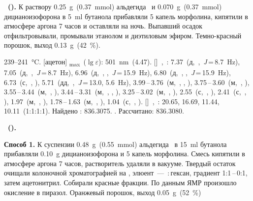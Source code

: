 \textbf{~().} К раствору \SI{0.25}{\gram}~(\SI{0.37}{\mmol}) альдегида~\textbf{} и \SI{0.070}{\gram}~(\SI{0.37}{\mmol}) дицианоизофорона в \SI{5}{\milli\litre} бутанола прибавляли 5 капель морфолина, кипятили в атмосфере аргона 7 часов и оставляли на ночь. Выпавший осадок отфильтровывали, промывали этанолом и диэтиловым эфиром. Темно-красный порошок, выход \SI{0.13}{\gram}~(\SI{42}{\percent}).
\begin{experimental}
     239--\SI{241}{\celsius}.
    [ацетон] \chemlambda\textsubscript{max}~($\lg \varepsilon$): \SI{501}{\nano\metre}~(4.47).
    []~\chemdelta,~\si{\ppm}: 7.37~(д,~,~\textit{J}\,=\,8.7~\si{\hertz}), 7.05~(д,~,~\textit{J}\,=\,8.7~\si{\hertz}), 6.96~(д,~, ,~\textit{J}\,=\,15.9~\si{\hertz}), 6.80~(д,~, ,~\textit{J}\,=\,15.9~\si{\hertz}), 6.73~(с,~, ), 5.71~(дд,~,~\textit{J}\,=\,13.0, 5.6~\si{\hertz}), 3.99\,--\,3.76~(м,~, , ), 3.75\,--\,3.60~(м,~, ), 3.55\,--\,3.44~(м,~, ), 3.44\,--\,3.31~(м,~, , ), 3.25\,--\,3.02~(м,~, ), 2.55~(с,~, ), 2.41~(с,~, ), 1.97~(м,~, ), 1.78\,--\,1.63~(м,~, ), 1.04~(с,~, ).
    []~\chemdelta,~\si{\ppm}: 20.65, 16.69, 11.44, 10.11~(1:1:1:1).
     Найдено \ce{[M+]}: \num{836.3075}. . Рассчитано:  \num{836.3080}.
\end{experimental}

\textbf{~().}

\textbf{Способ 1.} К суспензии \SI{0.48}{\gram}~(\SI{0.55}{\mmol}) альдегида~ в \SI{15}{\milli\litre} бутанола прибавляли \SI{0.10}{\gram} дицианоизофорона и 5 капель морфолина. Смесь кипятили в атмосфере аргона 7 часов, растворитель удаляли в вакууме. Твердый остаток очищали колоночной хроматографией на , элюент~--- \,:\,гексан, градиент 1:1\,--\,0:1, затем ацетонитрил. Собирали красные фракции. По данным ЯМР произошло окисление в пиразол.  Оранжевый порошок, выход \SI{0.05}{\gram}~(\SI{52}{\percent}) 

